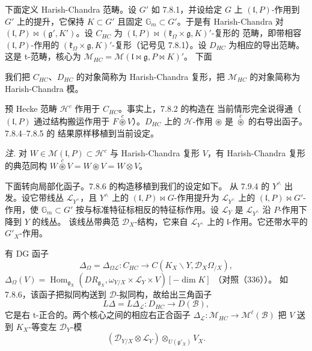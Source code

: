  下面定义 Harish-Chandra 范畴。设 $G'$ 如 7.8.1，并设给定
$G$ 上 $(\mathfrak{l},P)$-作用到 $G'$ 上的提升，它保持 $K\subset G'$ 且固定
$\mathbb{G}_{m}\subset G'$。于是有 Harish-Chandra 对
$(\mathfrak{l},P)\bowtie(\mathfrak{g}',K')$。设 $C_{HC}$ 为
$(\mathfrak{l},P)\bowtie(\mathfrak{k}_{\Omega}\times\mathfrak{g},K)'$-复形的
范畴，即带相容 $(\mathfrak{l},P)$-作用的
$(\mathfrak{k}_{\Omega}\times\mathfrak{g},K)'$-复形（记号见 7.8.1）。设
$D_{HC}$ 为相应的导出范畴。这是 t-范畴，核心为
$\mathcal{M}_{HC}=\mathcal{M}(\mathfrak{l}\bowtie\mathfrak{g},P\bowtie K)'$。
下面


我们把 $C_{HC}$、$D_{HC}$ 的对象简称为 Harish-Chandra 复形，把
$\mathcal{M}_{HC}$ 的对象简称为 Harish-Chandra 模。

预 Hecke 范畴 $\mathcal{H}^{c}$ 作用于 $C_{HC}$。事实上，7.8.2 的构造在
当前情形完全说得通（$(\mathfrak{l},P)$ 通过结构搬运作用于
$F\overset{c}{\circledast}V$）。$D_{HC}$ 上的 $\mathcal{H}$-作用
$\circledast$ 是 $\overset{c}{\circledast}$ 的右导出函子。7.8.4--7.8.5 的
结果原样移植到当前设定。

\emph{注.} 对 $W\in\mathcal{M}(\mathfrak{l},P)\subset\mathcal{H}^{c}$ 与
Harish-Chandra 复形 $V$，有 Harish-Chandra 复形的典范同构
$W\overset{c}{\circledast}V=W\circledast{}V=W\otimes V$。

 下面转向局部化函子。7.8.6 的构造移植到我们的设定如下。
从 7.9.4 的 $Y^{\wedge}$ 出发。设它带线丛 $\mathcal{L}_{Y^{\wedge}}$，且
$Y^{\wedge}$ 上的 $(\mathfrak{l},P)\bowtie G$-作用提升为
$\mathcal{L}_{Y^{\wedge}}$ 上的 $(\mathfrak{l},P)\bowtie G'$-作用，使
$\mathbb{G}_{m}\subset G'$ 按与标准特征标相反的特征标作用。设
$\mathcal{L}_{Y}$ 是 $\mathcal{L}_{Y^{\wedge}}$ 沿 $P$-作用下降到 $Y$ 的线丛。
该线丛带典范 $\mathcal{D}_{X}$-结构，它来自 $\mathcal{L}_{Y^{\wedge}}$ 上的
$\mathfrak{l}$-作用。它还带水平的 $G'_{X}$-作用。

有 DG 函子
\begin{equation}\tag{338}
\Delta_{\Omega}=\Delta_{\Omega\mathcal{L}}:C_{HC}\longrightarrow
C(K_{X}\backslash Y,\mathcal{D}_{X}\Omega_{/X}),
\end{equation}
$\Delta_{\Omega}(V)=\operatorname{Hom}_{\mathfrak{g}_{X}}
(DR_{\mathfrak{g}_{X}},\omega_{Y/X}\times\mathcal{L}_{Y}\times V)[-\dim K]$
（对照（336））。
如 7.8.6，该函子把拟同构送到 $\mathcal{D}$-拟同构，故给出三角函子
\begin{equation}\tag{339}
L\Delta=L\Delta_{\mathcal{L}}:D_{HC}\longrightarrow D(\mathcal{B}),
\end{equation}
它是右 t-正合的。两个核心之间的相应右正合函子
$\Delta_{\mathcal{L}}:\mathcal{M}_{HC}\longrightarrow\mathcal{M}^{\ell}(\mathcal{B})$
把 $V$ 送到 $K_{X}$-等变左 $\mathcal{D}_{Y}$-模
\[
(\mathcal{D}_{Y/X}\otimes\mathcal{L}_{Y})\otimes_{U(\mathfrak{g}'_{X})}V_{X}.
\]


